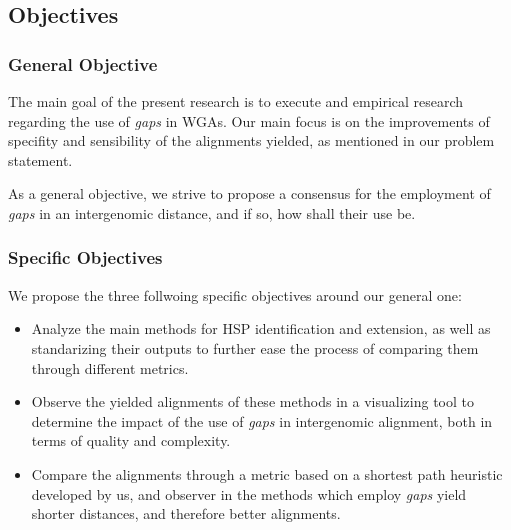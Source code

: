 \subsection{Objectives}

\subsubsection{General Objective}

The main goal of the present research is to execute and empirical research regarding the use of \textit{gaps} in WGAs. Our main focus is on the improvements of specifity and sensibility of the alignments yielded, as mentioned in our problem statement. 

\medskip

As a general objective, we strive to propose a consensus for the employment of \textit{gaps} in an intergenomic distance, and if so, how shall their use be.

\subsubsection{Specific Objectives}

We propose the three follwoing specific objectives around our general one:

\begin{itemize}
  \item Analyze the main methods for HSP identification and extension, as well as standarizing their outputs to further ease the process of comparing them through different metrics.
  \item Observe the yielded alignments of these methods in a visualizing tool to determine the impact of the use of \textit{gaps} in intergenomic alignment, both in terms of quality and complexity.
  \item Compare the alignments through a metric based on a shortest path heuristic developed by us, and observer in the methods which employ \textit{gaps} yield shorter distances, and therefore better alignments.
\end{itemize}